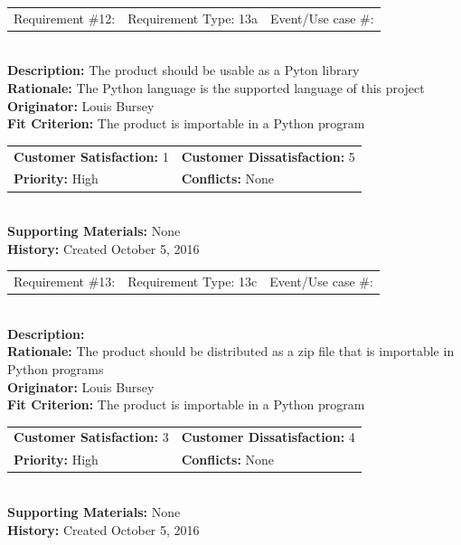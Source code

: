 \documentclass[12pt, titlepage]{article}
\begin{document}
%
%
\begin{reqbox}
\begin{tabular}{ccc}
Requirement \#12: & Requirement Type: 13a & Event/Use case \#: \\
\end{tabular} \\
\textbf{Description:} The product should be usable as a Pyton library \\
\textbf{Rationale:} The Python language is the supported language of this project\\
\textbf{Originator:} Louis Bursey\\
\textbf{Fit Criterion:}  The product is importable in a Python program\\
\begin{tabular}{ll}
\textbf{Customer Satisfaction:} 1 & \textbf{Customer Dissatisfaction:} 5 \\
\textbf{Priority:} High & \textbf{Conflicts:} None\\
\end{tabular} \\
\textbf{Supporting Materials:} None \\
\textbf{History:} Created October 5, 2016
\end{reqbox}
%
%
%
%
%
\begin{reqbox}
\begin{tabular}{ccc}
Requirement \#13: & Requirement Type: 13c & Event/Use case \#: \\
\end{tabular} \\
\textbf{Description:} \\
\textbf{Rationale:} The product should be distributed as a zip file that is importable in Python programs\\
\textbf{Originator:} Louis Bursey\\
\textbf{Fit Criterion:}  The product is importable in a Python program\\
\begin{tabular}{ll}
\textbf{Customer Satisfaction:} 3 & \textbf{Customer Dissatisfaction:} 4 \\
\textbf{Priority:} High & \textbf{Conflicts:} None\\
\end{tabular} \\
\textbf{Supporting Materials:} None \\
\textbf{History:} Created October 5, 2016
\end{reqbox}
\end{document}

